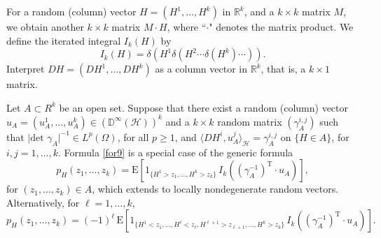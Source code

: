 \documentclass[12pt,a4paper]{article}
\newcommand{\bD}{{\mathbb{D}}}
\newcommand{\R}{{\mathbb{R}}}
\newcommand{\E}{\mathrm{E}}
\newcommand{\HH}{\mathcal{H}}
\newcommand{\rT}{\text{T}}
\newcommand{\<}{\langle}
\renewcommand{\>}{\rangle}
\begin{document}
\begin{remark}\label{rd07_02r1}
For a random (column) vector $H= (H^1,\dots,H^k)$ in $\R^k$, and a $k \times k$ matrix $M$, we obtain another $k \times k$ matrix $M \cdot H$, where ``$\cdot$" denotes the matrix product. We define the iterated integral $I_k(H)$ by
\begin{equation}\label{rd04_07e1}
I_k(H) = \delta(H^1 \delta (H^2 \cdots \delta(H^k) \cdots)).
\end{equation}
Interpret $DH = (DH^1,\dots,DH^k)$ as a column vector in $\R^k$, that is, a $k \times 1$ matrix.

Let $A \subset R^k$ be an open set.  Suppose that there exist a random (column) vector $u_A = (u_A^1,\dots, u_A^k) \in (\bD^\infty(\HH))^k$ and a  $k \times k$ random matrix $(\gamma_A^{i, j})$ such that $\vert \text{det } \gamma_A \vert^{-1} \in L^p(\Omega)$, for all $p\geq 1$, and $\langle DH^i, u_A^j \rangle_\HH = \gamma_A^{i, j}$ on $\{H \in A \}$, for $i, j = 1,\dots, k$.
Formula \eqref{for9}  is a special case of the generic formula
\begin{equation}\label{rd04_06e1}
     p_H(z_1,\dots,z_k) = \E\left[1_{\{H^1 > z_1,\dots, H^k > z_k \}}\, I_k( (\gamma_A^{-1})^\rT \cdot  u_A)\right],
\end{equation}
for $(z_1,\dots,z_k) \in A$, which extends \cite[(2.34)]{nualart2006} to locally nondegenerate random vectors. Alternatively, for $\ell = 1,\dots, k$,
\begin{equation*}%
     p_H(z_1,\dots,z_k) = (-1)^\ell\, \E\left[1_{\{H^1 < z_1,\dots, H^\ell < z_\ell, H^{\ell +1} > z_{\ell + 1},\dots, H^k > z_k  \}}\, I_k( (\gamma_A^{-1})^\rT \cdot  u_A)\right].
\end{equation*}

\end{remark}
 
\end{document}
